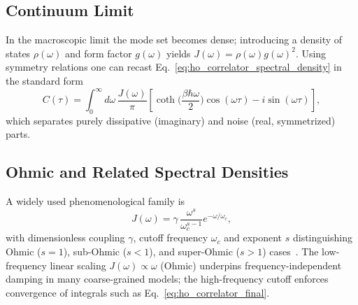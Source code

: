 \subsection{Continuum Limit}
\label{subsec:continuum_limit}
In the macroscopic limit the mode set becomes dense; introducing a density of states $\rho(\omega)$ and form factor $g(\omega)$ yields $J(\omega)=\rho(\omega) g(\omega)^2$. Using symmetry relations one can recast Eq.~\eqref{eq:ho_correlator_spectral_density} in the standard form
\begin{equation} \label{eq:ho_correlator_final}
	C(\tau) = \int_{0}^{\infty} d\omega \, \frac{J(\omega)}{\pi} \left[ \coth\Big(\frac{\beta \hbar \omega}{2}\Big) \cos(\omega \tau) - i \sin(\omega \tau) \right],
\end{equation}
which separates purely dissipative (imaginary) and noise (real, symmetrized) parts.

\subsection{Ohmic and Related Spectral Densities}
\label{subsec:ohmic_spectral_density}
A widely used phenomenological family is
\begin{equation} \label{eq:ho_ohmic_spectral_density}
	J(\omega) = \gamma \, \frac{\omega^{s}}{\omega_c^{s-1}} e^{-\omega/\omega_c},
\end{equation}
with dimensionless coupling $\gamma$, cutoff frequency $\omega_c$ and exponent $s$ distinguishing Ohmic ($s=1$), sub-Ohmic ($s<1$), and super-Ohmic ($s>1$) cases~\cite{weiss2012quantumdissipativesystems, lambertetal2024qutip5quantum}. The low-frequency linear scaling $J(\omega) \propto \omega$ (Ohmic) underpins frequency-independent damping in many coarse-grained models; the high-frequency cutoff enforces convergence of integrals such as Eq.~\eqref{eq:ho_correlator_final}.

\iffalse
	\begin{figure}[t]
		\centering
		\texttt{[image: bath\_comparison\_combined\_0.010\_100.00\_100.000.png]}
		\caption{Comparison of representative bath models (Ohmic and Drude--Lorentz) showing spectral densities, associated power spectra, and time-domain correlation functions for coupling strength $\alpha = 0.1$, cutoff $\omega_c = 100$, and temperature $T=100$. Distinct spectral shapes map directly onto different relaxation and dephasing behaviors.}
		\label{fig:bath_comparison}
	\end{figure}
	\begin{figure}
		\centering
		\texttt{[image: temperature\_analysis\_ohmic\_bath.png]}
		\caption{Temperature dependence of the bath correlation function for an Ohmic bath with $\alpha = 1$ and cutoff $\omega_c = 100$. Higher temperatures increase the amplitude and decrease the correlation time, reflecting enhanced thermal fluctuations.}
		\label{fig:bath_temperature_comparison}
	\end{figure}
\fi
